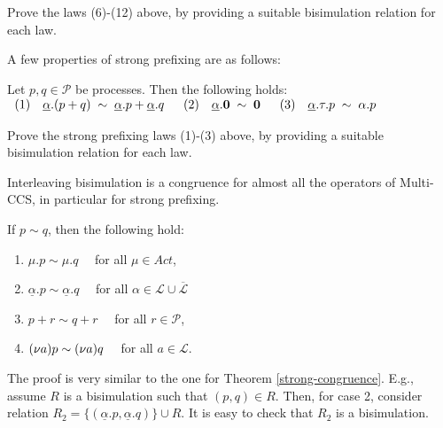 \begin{exercise}
Prove the laws (6)-(12) above, by providing a suitable bisimulation relation for each law.
\fine
\end{exercise}


A few properties of strong prefixing are as follows:

\begin{proposition}\label{prop}
Let $p, q \in {\mathcal P}$ be processes. Then the following holds:\\

$\begin{array}{lllllr}
(1) & \underline\alpha.(p + q)  \; \sim \;   \underline\alpha.p +  \underline\alpha.q & \; \;
(2) &  \underline\alpha.\mbox{\bf 0}  \; \sim \;   \mbox{\bf 0} & \; \;
(3) &  \underline\alpha.\tau.p   \; \sim \;  \alpha.p \\
\end{array}
$\\[-.8cm]

\fine
\end{proposition}

\begin{exercise}
Prove the strong prefixing laws (1)-(3) above, by providing a suitable bisimulation relation for each law.
\fine
\end{exercise}

Interleaving bisimulation is a congruence for almost all the operators of Multi-CCS, in particular for strong prefixing.

\begin{proposition}
If $p \sim q$, then the following hold:
\begin{enumerate}
\item  $\mu.p \sim \mu.q \quad$ for all $\mu \in Act$,
\item $\underline{\alpha}.p \sim \underline{\alpha}.q \quad$ for all $\alpha \in \mathcal{L}\cup\overline{\mathcal{L}}$
\item $p + r \sim q + r \quad $ for all  $r \in \mathcal{P}$,
\item $\mbox{$({\bf\nu} a)$}p \sim \mbox{$({\bf\nu} a)$}q \quad$ for all $a \in \mathcal{L}$.
\end{enumerate}

\proof
The proof is very similar to the one for Theorem \ref{strong-congruence}. E.g., 
assume $R$ is a bisimulation such that $(p, q) \in R$.
Then, for case 2,  consider relation $R_2 = \{(\underline\alpha.p, \underline\alpha.q)\} \cup R$. 
It is easy to check that $R_2$ is a bisimulation.
\fine
\end{proposition}

